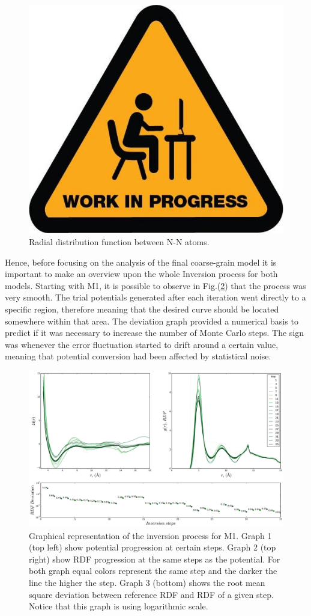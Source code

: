 \documentclass[10pt,a4paper,twoside]{article}
\begin{document}
\begin{figure}[H]
  \begin{center}
	\includegraphics[width=0.3 \textwidth]{./images/wip}
	\caption{Radial distribution function between N-N atoms. }
	\label{Fig:wrong}
  \end{center}
\end{figure}

Hence, before focusing on the analysis of the final coarse-grain model it is important to make an overview upon the whole Inversion process for both models. Starting with M1, it is possible to observe in Fig.(\ref{Fig:convM1}) that the process was very smooth. The trial potentials generated after each iteration went directly to a specific region, therefore meaning that the desired curve should be located somewhere within that area. The deviation graph provided a numerical basis to predict if it was necessary to increase the number of Monte Carlo steps. The sign was whenever the error fluctuation started to drift around a certain value, meaning that potential conversion had been affected by statistical noise.
 
\begin{figure}[H]
  \begin{center}
	\includegraphics[width=1 \textwidth]{./graphs/ConvLow}
	\caption{Graphical representation of the inversion process for M1. Graph 1 (top left) show potential progression at certain steps. Graph 2 (top right) show RDF progression at the same steps as the potential. For both graph equal colors represent the same step and the darker the line the higher the step. Graph 3 (bottom) shows the root mean square deviation between reference RDF and RDF of a given step. Notice that this graph is using logarithmic scale.}
	\label{Fig:convM1}
  \end{center}
\end{figure} 
\end{document}
